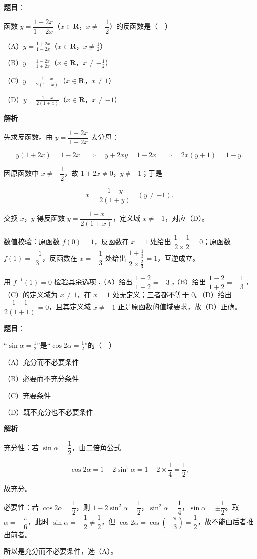 \begin{answer}

\textbf{题目}：

函数 $y=\dfrac{1-2x}{1+2x}$（$x\in\mathbf R$，$x\neq-\dfrac12$）的反函数是（　）

（A）$y=\frac{1+2x}{1-2x}$（$x\in\mathbf R$，$x\neq\frac12$）

（B）$y=\frac{1-2x}{1+2x}$（$x\in\mathbf R$，$x\neq-\frac12$）

（C）$y=\frac{1+x}{2(1-x)}$（$x\in\mathbf R$，$x\neq1$）

（D）$y=\frac{1-x}{2(1+x)}$（$x\in\mathbf R$，$x\neq-1$）

\textbf{解析}

先求反函数。由 $y=\dfrac{1-2x}{1+2x}$ 去分母：

\nopagebreak[4]
\[y(1+2x)=1-2x\quad\Longrightarrow\quad y+2xy=1-2x\quad\Longrightarrow\quad 2x(y+1)=1-y.\]

因原函数中 $x\neq-\dfrac12$，故 $1+2x\neq0$，$y\neq-1$；于是

\nopagebreak[4]
\[x=\frac{1-y}{2(1+y)}\quad(y\neq-1).\]

交换 $x$，$y$ 得反函数 $y=\dfrac{1-x}{2(1+x)}$，定义域 $x\neq-1$，对应（D）。

数值校验：原函数 $f(0)=1$，反函数在 $x=1$ 处给出 $\dfrac{1-1}{2\times2}=0$；原函数 $f(1)=\dfrac{-1}{3}$，反函数在 $x=-\dfrac13$ 处给出 $\dfrac{1+\frac13}{2\times\frac23}=1$，互逆成立。

用 $f^{-1}(1)=0$ 检验其余选项：（A）给出 $\dfrac{1+2}{1-2}=-3$；（B）给出 $\dfrac{1-2}{1+2}=-\dfrac13$；（C）的定义域为 $x\neq1$，在 $x=1$ 处无定义；三者都不等于 $0$。（D）给出 $\dfrac{1-1}{2(1+1)}=0$，且其定义域 $x\neq-1$ 正是原函数的值域要求，故（D）正确。


\end{answer}
\begin{answer}

\textbf{题目}：

“$\sin\alpha=\frac12$”是“$\cos2\alpha=\frac12$”的（　）

（A）充分而不必要条件

（B）必要而不充分条件

（C）充要条件

（D）既不充分也不必要条件

\textbf{解析}

充分性：若 $\sin\alpha=\dfrac12$，由二倍角公式

\nopagebreak[4]
\[\cos2\alpha=1-2\sin^2\alpha=1-2\times\frac14=\frac12,\]

故充分。

必要性：若 $\cos2\alpha=\dfrac12$，则 $1-2\sin^2\alpha=\dfrac12$，$\sin^2\alpha=\dfrac14$，$\sin\alpha=\pm\dfrac12$。取 $\alpha=-\dfrac\pi6$，此时 $\sin\alpha=-\dfrac12\ne\dfrac12$，但 $\cos2\alpha=\cos\left(-\dfrac\pi3\right)=\dfrac12$，故不能由后者推出前者。

所以是充分而不必要条件，选（A）。


\end{answer}
